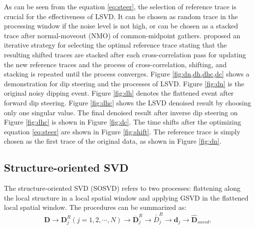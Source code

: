 As can be seen from the equation \ref{eq:steer}, the selection of reference trace is crucial for the effectiveness of LSVD. It can be chosen as random trace in the processing window if the noise level is not high, or can be chosen as a stacked trace after normal-moveout (NMO) of common-midpoint gathers. \cite{bekara2007} proposed an iterative strategy for selecting the optimal reference trace stating that the resulting shifted traces are stacked after each cross-correlation pass for updating the new reference traces and the process of cross-correlation, shifting, and stacking is repeated until the process converges.
Figure \ref{fig:dn,dh,dhc,dc} shows a demonstration for dip steering and the processes of LSVD. Figure \ref{fig:dn} is the original noisy dipping event. Figure \ref{fig:dh} denotes the flattened event after forward dip steering. Figure \ref{fig:dhc} shows the LSVD denoised result by choosing only one singular value. The final denoised result after inverse dip steering on Figure \ref{fig:dhc} is shown in Figure \ref{fig:dc}. The time shifts after the optimizing equation \ref{eq:steer} are shown in Figure \ref{fig:shift}. The reference trace is simply chosen as the first trace of the original data, as shown in Figure \ref{fig:dn}.






\subsection{Structure-oriented SVD}
The structure-oriented SVD (SOSVD) refers to two processes: flattening along the local structure in a local  spatial window and applying GSVD in the flattened local spatial window. The procedures can be summarized as:
\begin{equation}
\label{eq:proc}
\mathbf{D} \rightarrow \mathbf{D}_j^R (j=1,2,\cdots,N) \rightarrow \overline{\mathbf{D}}_j^R \rightarrow \overline{\overline{D}}_j^R \rightarrow \mathbf{d}_j \rightarrow \hat{\mathbf{D}}_{sosvd}.
\end{equation}


